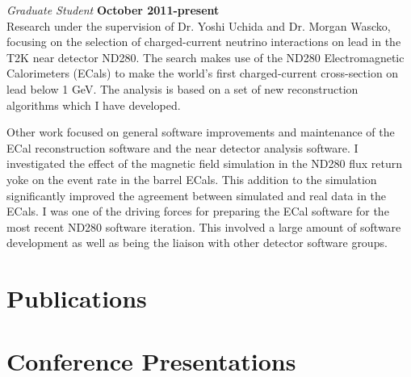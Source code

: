 \documentclass[margin,line]{res}
\newenvironment{list2}{
  \begin{list}{$\bullet$}{%
      \setlength{\itemsep}{0in}
      \setlength{\parsep}{0in} \setlength{\parskip}{0in}
      \setlength{\topsep}{0in} \setlength{\partopsep}{0in} 
      \setlength{\leftmargin}{0.2in}}}{\end{list}}
\begin{document}
\begin{resume}
\vspace{-.3cm}
{\em Graduate Student} \hfill {\bf October 2011-present}\\
Research under the supervision of Dr. Yoshi Uchida and Dr. Morgan Wascko, focusing on the selection of charged-current neutrino interactions on lead in the T2K near detector ND280.  The search makes use of the ND280 Electromagnetic Calorimeters (ECals) to make the world's first charged-current cross-section on lead below 1 GeV.  The analysis is based on a set of new reconstruction algorithms which I have developed.

Other work focused on general software improvements and maintenance of the ECal reconstruction software and the near detector analysis software.  I investigated the effect of the magnetic field simulation in the ND280 flux return yoke on the event rate in the barrel ECals.  This addition to the simulation significantly improved the agreement between simulated and real data in the ECals.  I was one of the driving forces for preparing the ECal software for the most recent ND280 software iteration.  This involved a large amount of software development as well as being the liaison with other detector software groups.

 

 
\section{\sc Publications}
\nocite{*}
%



\section{\sc Conference Presentations}


\end{resume}
\end{document}
